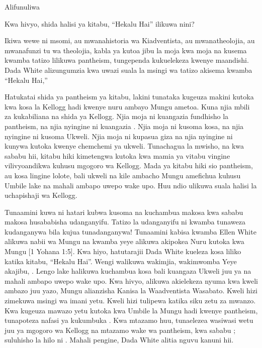 Alifunuliwa 

Kwa hivyo, shida halisi ya kitabu, “Hekalu Hai” ilikuwa nini?

Ikiwa wewe ni msomi, au mwanahistoria wa Kiadventista, au mwanatheolojia, au mwanafunzi tu wa theolojia, kabla ya kutoa jibu la moja kwa moja na kusema kwamba tatizo lilikuwa pantheism, tungependa kukuelekeza kwenye maandishi. Dada White alizungumzia kwa uwazi suala la msingi wa tatizo akisema kwamba “Hekalu Hai,” 

Hatukatai shida ya pantheism ya kitabu, lakini tunataka kugeuza makini kutoka kwa kosa la Kellogg hadi kwenye nuru ambayo Mungu ametoa. Kuna njia mbili za kukabiliana na shida ya Kellogg. Njia moja ni kuangazia fundhisho la pantheism, na njia nyingine ni kuangazia . Njia moja ni kusoma kosa, na njia nyingine ni kusoma Ukweli. Njia moja ni kupasua giza na njia nyingine ni kunywa kutoka kwenye chemchemi ya ukweli. Tunachagua la mwisho, na kwa sababu hii, kitabu hiki kimetengwa kutoka kwa mamia ya vitabu vingine vilivyoandikwa kuhusu mgogoro wa Kellogg. Mada ya kitabu hiki sio pantheism, au kosa lingine lolote, bali ukweli na kile ambacho Mungu amefichua kuhusu Umbile lake na mahali ambapo uwepo wake upo. Huu ndio ulikuwa suala halisi la uchapishaji wa Kellogg.

Tunaamini kuwa ni hatari kubwa kusoma na kuchambua makosa kwa sababu makosa husababisha udanganyifu. Tatizo la udanganyifu ni kwamba tunaweza kudanganywa bila kujua tunadanganywa! Tunaamini kabisa kwamba Ellen White alikuwa nabii wa Mungu na kwamba yeye alikuwa akipokea Nuru kutoka kwa Mungu [1 Yohana 1:5]. Kwa hiyo, hatutarajii Dada White kueleza kosa liliko katika kitabu, “Hekalu Hai”. Wengi walikuwa wakimjia, wakimwomba  Yeye akajibu, . Lengo lake halikuwa kuchambua kosa bali kuangaza Ukweli juu ya  na mahali ambapo uwepo wake upo. Kwa hivyo, alikuwa akielekeza nyuma kwa kweli ambazo juu yazo, Mungu alianzisha Kanisa la Waadventista Wasabato. Kweli hizi zimekuwa msingi wa imani yetu. Kweli hizi tulipewa katika siku zetu za mwanzo. Kwa kugeuza mawazo yetu kutoka kwa Umbile la Mungu hadi kwenye pantheism, tunapoteza nafasi ya kukumbuka . Kwa mtazamo huu, tunaelezea wasiwasi wetu juu ya mgogoro wa Kellogg na mtazamo wake wa pantheism, kwa sababu ; suluhisho la hilo ni . Mahali pengine, Dada White alitia nguvu kanuni hii.

